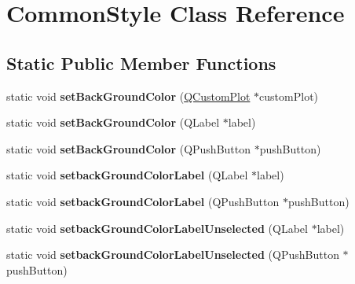 \hypertarget{class_common_style}{}\section{Common\+Style Class Reference}
\label{class_common_style}
\subsection*{Static Public Member Functions}
\begin{DoxyCompactItemize}
\item 
\mbox{\label{class_common_style_a97266937eac6f16cdb12751acd7fd79b}} 
static void {\bfseries set\+Back\+Ground\+Color} (\hyperlink{class_q_custom_plot}{Q\+Custom\+Plot} $\ast$custom\+Plot)
\item 
\mbox{\label{class_common_style_a91d43c7e2a8c3accd3a5f0649fc41536}} 
static void {\bfseries set\+Back\+Ground\+Color} (Q\+Label $\ast$label)
\item 
\mbox{\label{class_common_style_a037a10b40b4b2c6c568942ce67b204bf}} 
static void {\bfseries set\+Back\+Ground\+Color} (Q\+Push\+Button $\ast$push\+Button)
\item 
\mbox{\label{class_common_style_acda9406b92dea84623275e2c9b505a5e}} 
static void {\bfseries setback\+Ground\+Color\+Label} (Q\+Label $\ast$label)
\item 
\mbox{\label{class_common_style_ad2df80d0704da33a9aa124a79a512b4b}} 
static void {\bfseries setback\+Ground\+Color\+Label} (Q\+Push\+Button $\ast$push\+Button)
\item 
\mbox{\label{class_common_style_a6142c7d04e48d7d6b30acd50ffe35a2d}} 
static void {\bfseries setback\+Ground\+Color\+Label\+Unselected} (Q\+Label $\ast$label)
\item 
\mbox{\label{class_common_style_af40dc1f2ba0f1fe97f449cb99048ff4b}} 
static void {\bfseries setback\+Ground\+Color\+Label\+Unselected} (Q\+Push\+Button $\ast$push\+Button)
\item 
\mbox{\label{class_common_style_a5378364108e10198f076c723ec326f71}} 

\end{DoxyCompactItemize}
